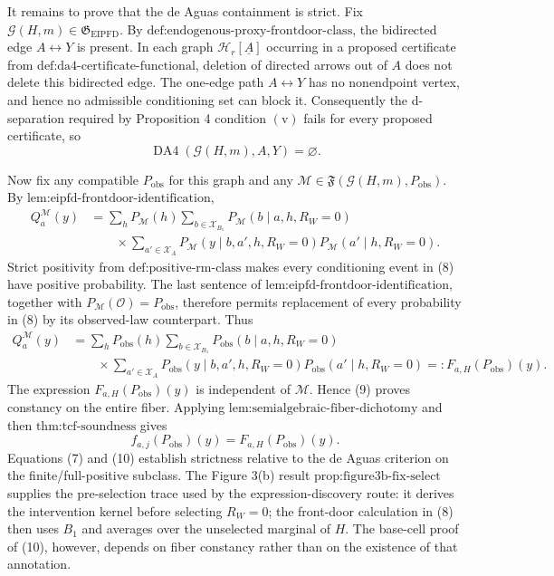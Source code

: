 It remains to prove that the de Aguas containment is strict. Fix \(\mathcal G(H,m)\in\mathfrak G_{\mathrm{EIPFD}}\). By \(\text{def:endogenous-proxy-frontdoor-class}\), the bidirected edge \(A\leftrightarrow Y\) is present. In each graph \(\mathcal H_r[\underline A]\) occurring in a proposed certificate from \(\text{def:da4-certificate-functional}\), deletion of directed arrows out of \(A\) does not delete this bidirected edge. The one-edge path \(A\leftrightarrow Y\) has no nonendpoint vertex, and hence no admissible conditioning set can block it. Consequently the d-separation required by Proposition 4 condition \(\mathrm{(v)}\) fails for every proposed certificate, so
\[
\operatorname{DA4}(\mathcal G(H,m),A,Y)=\varnothing.
\tag{7}
\]

Now fix any compatible \(P_{\mathrm{obs}}\) for this graph and any \(\mathcal M\in\mathfrak F(\mathcal G(H,m),P_{\mathrm{obs}})\). By \(\text{lem:eipfd-frontdoor-identification}\),
\[
\begin{aligned}
Q_a^{\mathcal M}(y)
&=\sum_hP_{\mathcal M}(h)
  \sum_{b\in\mathcal X_{B_1}}P_{\mathcal M}(b\mid a,h,R_W=0)\\
&\qquad\times\sum_{a'\in\mathcal X_A}
 P_{\mathcal M}(y\mid b,a',h,R_W=0)
 P_{\mathcal M}(a'\mid h,R_W=0).
\end{aligned}
\tag{8}
\]
Strict positivity from \(\text{def:positive-rm-class}\) makes every conditioning event in (8) have positive probability. The last sentence of \(\text{lem:eipfd-frontdoor-identification}\), together with \(P_{\mathcal M}(\mathcal O)=P_{\mathrm{obs}}\), therefore permits replacement of every probability in (8) by its observed-law counterpart. Thus
\[
\begin{aligned}
Q_a^{\mathcal M}(y)
&=\sum_hP_{\mathrm{obs}}(h)
  \sum_{b\in\mathcal X_{B_1}}P_{\mathrm{obs}}(b\mid a,h,R_W=0)\\
&\qquad\times\sum_{a'\in\mathcal X_A}
 P_{\mathrm{obs}}(y\mid b,a',h,R_W=0)
 P_{\mathrm{obs}}(a'\mid h,R_W=0)
=:F_{a,H}(P_{\mathrm{obs}})(y).
\end{aligned}
\tag{9}
\]
The expression \(F_{a,H}(P_{\mathrm{obs}})(y)\) is independent of \(\mathcal M\). Hence (9) proves constancy on the entire fiber. Applying \(\text{lem:semialgebraic-fiber-dichotomy}\) and then \(\text{thm:tcf-soundness}\) gives
\[
f_{a,j}(P_{\mathrm{obs}})(y)=F_{a,H}(P_{\mathrm{obs}})(y).
\tag{10}
\]
Equations (7) and (10) establish strictness relative to the de Aguas criterion on the finite/full-positive subclass. The Figure 3(b) result \(\text{prop:figure3b-fix-select}\) supplies the pre-selection trace used by the expression-discovery route: it derives the intervention kernel before selecting \(R_W=0\); the front-door calculation in (8) then uses \(B_1\) and averages over the unselected marginal of \(H\). The base-cell proof of (10), however, depends on fiber constancy rather than on the existence of that annotation.

